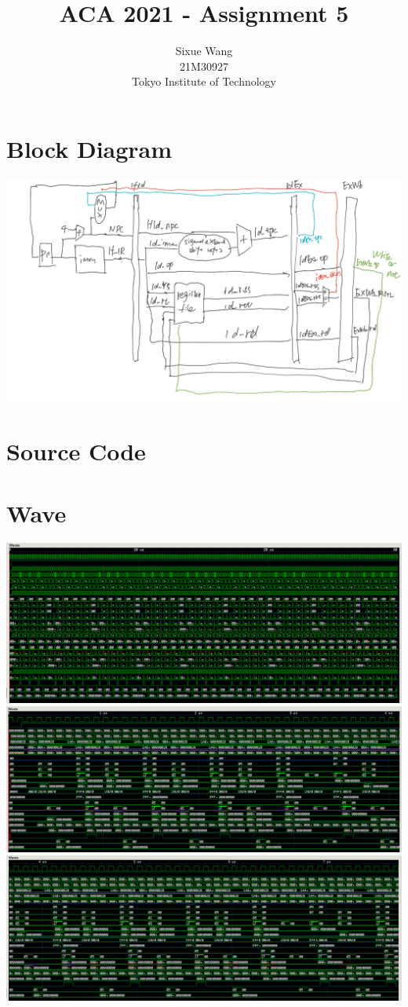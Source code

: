 \documentclass{article}
\title{ACA 2021 - Assignment 5}
\author{Sixue Wang\\21M30927\\Tokyo Institute of Technology}
\begin{document}
\maketitle

\section*{Block Diagram}
\includegraphics[width=\textwidth]{bne_diagram}

\section*{Source Code}


\section*{Wave}
\includegraphics[width=\textwidth]{bne_wave1}
\includegraphics[width=\textwidth]{bne_wave2}
\includegraphics[width=\textwidth]{bne_wave3}
\end{document}
